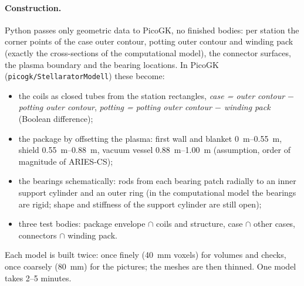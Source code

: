 \documentclass[10pt,a4paper]{article}
\begin{document}
\paragraph{Construction.} Python passes only geometric data to PicoGK, no finished bodies: per station the corner points
of the case outer contour, potting outer contour and winding pack (exactly the cross-sections of the computational
model), the connector surfaces, the plasma boundary and the bearing locations. In PicoGK
(\texttt{picogk/StellaratorModell}) these become:
\begin{itemize}\itemsep1pt
\item the coils as closed tubes from the station rectangles, \emph{case = outer contour $-$ potting outer contour},
  \emph{potting = potting outer contour $-$ winding pack} (Boolean difference);
\item the package by offsetting the plasma: first wall and blanket \SIrange{0}{0.55}{m}, shield \SIrange{0.55}{0.88}{m},
  vacuum vessel \SIrange{0.88}{1.00}{m} (assumption, order of magnitude of ARIES-CS);
\item the bearings schematically: rods from each bearing patch radially to an inner support cylinder and an outer ring
  (in the computational model the bearings are rigid; shape and stiffness of the support cylinder are still open);
\item three test bodies: package envelope $\cap$ coils and structure, case $\cap$ other cases, connectors $\cap$ winding pack.
\end{itemize}
Each model is built twice: once finely (\SI{40}{mm} voxels) for volumes and checks, once coarsely (\SI{80}{mm}) for the
pictures; the meshes are then thinned. One model takes 2--5 minutes.

\begin{table}[H]\centering\scriptsize\caption{PicoGK models: deviation of the voxel volumes
from the computational model and overlaps.}\end{table}
\end{document}
